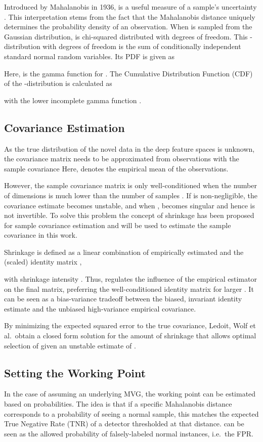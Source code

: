 \documentclass[conference, a4paper]{./template/IEEEtran}
\begin{document}
Introduced by Mahalanobis in 1936,  is a useful measure of a sample's uncertainty \cite{Mahalanobis1936}.
This interpretation stems from the fact that the Mahalanobis distance uniquely determines the probability density  of an observation.
When  is sampled from the Gaussian distribution,  is chi-squared distributed with  degrees of freedom.
This -distribution with  degrees of freedom is the sum of  conditionally independent standard normal random variables.
Its PDF is given as

Here,  is the gamma function for .
The Cumulative Distribution Function (CDF) of the -distribution is calculated as

with the lower incomplete gamma function .

\subsection{Covariance Estimation}

As the true distribution of the novel data in the deep feature spaces is unknown, the covariance matrix  needs to be approximated from observations  with the sample covariance 
Here,  denotes the empirical mean of the observations.

However, the sample covariance matrix is only well-conditioned when the number of dimensions  is much lower than the number of samples .
If  is non-negligible, the covariance estimate becomes unstable, and when ,  becomes singular and hence is not invertible. To solve this problem the concept of shrinkage has been proposed for sample covariance estimation and will be used to estimate the sample covariance in this work.

Shrinkage is defined as a linear combination of empirically estimated  and the (scaled) identity matrix ,

with shrinkage intensity .
Thus,  regulates the influence of the empirical estimator on the final matrix, preferring the well-conditioned identity matrix for larger .
It can be seen as a bias-variance tradeoff between the biased, invariant identity estimate and the unbiased high-variance empirical covariance.

By minimizing the expected squared error  to the true covariance, Ledoit, Wolf et al.\ obtain a closed form solution for the amount of shrinkage that allows optimal selection of  given an unstable estimate of  \cite{Ledoit2004}.


\subsection{Setting the Working Point}
In the case of assuming an underlying MVG, the working point can be estimated based on probabilities.
The idea is that if a specific Mahalanobis distance corresponds to a probability  of seeing a normal sample, this matches the expected True Negative Rate (TNR) of a detector thresholded at that distance.
 can be seen as the allowed probability of falsely-labeled normal instances, i.e.\ the FPR.
\end{document}
